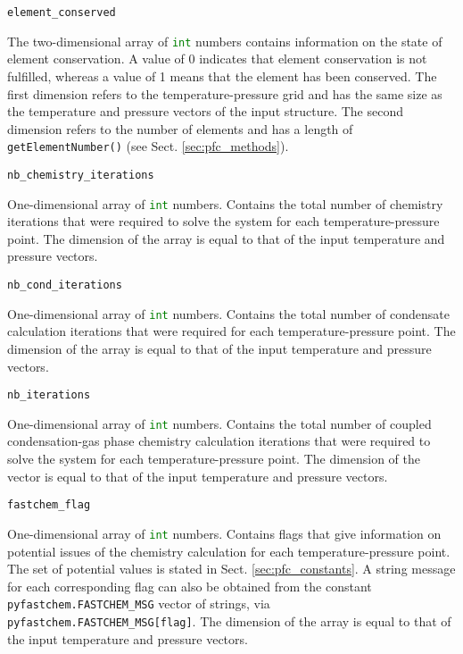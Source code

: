 \documentclass[numbers=noenddot]{aux/fcmanual}
\begin{document}
\bigbreak

\lstinline!element_conserved!
\begin{addmargin}[25pt]{0pt}
	The two-dimensional array of \lstinline[language=Python]!int! numbers contains information on the state of element conservation. A value of 0 indicates that element conservation is not fulfilled, whereas a value of 1 means that the element has been conserved. The first dimension refers to the temperature-pressure grid and has the same size as the temperature and pressure vectors of the input structure. The second dimension refers to the number of elements and has a length of \lstinline!getElementNumber()! (see Sect. \ref{sec:pfc_methods}).
\end{addmargin}

\bigbreak

\lstinline!nb_chemistry_iterations!
\begin{addmargin}[25pt]{0pt}
	One-dimensional array of \lstinline[language=Python]!int! numbers. Contains the total number of chemistry iterations that were required to solve the system for each temperature-pressure point. The dimension of the array is equal to that of the input temperature and pressure vectors.
\end{addmargin}

\bigbreak

\lstinline!nb_cond_iterations!
\begin{addmargin}[25pt]{0pt}
	One-dimensional array of \lstinline[language=Python]!int! numbers. Contains the total number of condensate calculation iterations that were required for each temperature-pressure point. The dimension of the array is equal to that of the input temperature and pressure vectors.
\end{addmargin}

\bigbreak

\lstinline!nb_iterations!
\begin{addmargin}[25pt]{0pt}
	One-dimensional array of \lstinline[language=Python]!int! numbers. Contains the total number of coupled condensation-gas phase chemistry calculation iterations that were required to solve the system for each temperature-pressure point. The dimension of the vector is equal to that of the input temperature and pressure vectors.
\end{addmargin}

\bigbreak

\lstinline!fastchem_flag!
\begin{addmargin}[25pt]{0pt}
	One-dimensional array of \lstinline[language=Python]!int! numbers. Contains flags that give information on potential issues of the chemistry calculation for each temperature-pressure point. The set of potential values is stated in Sect. \ref{sec:pfc_constants}. A string message for each corresponding flag can also be obtained from the constant \lstinline!pyfastchem.FASTCHEM_MSG! vector of strings, via \lstinline!pyfastchem.FASTCHEM_MSG[flag]!. The dimension of the array is equal to that of the input temperature and pressure vectors.
\end{addmargin}
\end{document}
